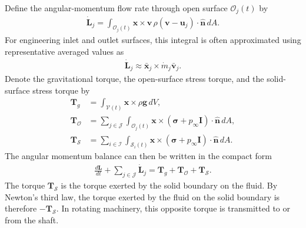 Define the angular-momentum flow rate through open surface $\mathcal{O}_j(t)$ by
\begin{align}
    \dot{\bm{L}}_j
    =
    \int_{\mathcal{O}_j(t)}
    \bm{x}\times\bm{v}\,
    \rho(\bm{v}-\bm{u}_j)\cdot\bm{\hat{n}}\,dA.
\end{align}
For engineering inlet and outlet surfaces, this integral is often approximated using representative averaged values as
\begin{align}
    \dot{\bm{L}}_j
    \approx
    \bar{\bm{x}}_j\times\dot{m}_j\bar{\bm{v}}_j.
\end{align}
Denote the gravitational torque, the open-surface stress torque, and the
solid-surface stress torque by
\begin{align}
    \bm{T}_g&=\int_{\mathcal{V}(t)}
    \bm{x}\times\rho\bm{g}\,dV,
    \\
    \bm{T}_{\mathcal{O}}&=\sum_{j\in\mathcal{J}}\int_{\mathcal{O}_j(t)}\bm{x}\times(\bm{\sigma}+p_\infty\bm{I})\cdot\bm{\hat{n}}\,dA,
    \\
    \bm{T}_{\mathcal{S}}&=\sum_{i\in\mathcal{I}}\int_{\mathcal{S}_i(t)}\bm{x}\times(\bm{\sigma}+p_\infty\bm{I})\cdot\bm{\hat{n}}\,dA.
\end{align}
The angular momentum balance can then be written in the compact form
\begin{align}\label{eq:angular-momentum-balance-control-volume}
    \frac{d\bm{L}}{dt}+\sum_{j\in\mathcal{J}}\dot{\bm{L}}_j=\bm{T}_g+\bm{T}_{\mathcal{O}}+\bm{T}_{\mathcal{S}}.
\end{align}
The torque $\bm{T}_\mathcal{S}$ is the torque exerted by the solid
boundary on the fluid. By Newton's third law, the torque exerted by the
fluid on the solid boundary is therefore $-\bm{T}_\mathcal{S}$. In
rotating machinery, this opposite torque is transmitted to or from the
shaft.


